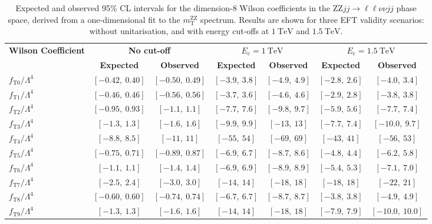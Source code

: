 \begin{table}[!htbp]
\centering
\scriptsize
\renewcommand{\arraystretch}{1.5}
\begin{tabular}{l c c c c c c}
\hline
\textbf{Wilson Coefficient} & 
\multicolumn{2}{c}{\textbf{No cut-off}} & 
\multicolumn{2}{c}{\textbf{$E_{\text{c}} = 1~\text{TeV}$}} & 
\multicolumn{2}{c}{\textbf{$E_{\text{c}} = 1.5~\text{TeV}$}} \\
\cline{2-7}
& \textbf{Expected} & \textbf{Observed} & 
  \textbf{Expected} & \textbf{Observed} & 
  \textbf{Expected} & \textbf{Observed} \\
\hline
$f_{\text{T}0}/\Lambda^4$ & $[-0.42,\ 0.40]$ & $[-0.50,\ 0.49]$ & $[-3.9,\ 3.8]$ & $[-4.9,\ 4.9]$ & $[-2.8,\ 2.6]$ & $[-4.0,\ 3.4]$ \\
$f_{\text{T}1}/\Lambda^4$ & $[-0.46,\ 0.46]$ & $[-0.56,\ 0.56]$ & $[-3.7,\ 3.6]$ & $[-4.6,\ 4.6]$ & $[-2.9,\ 2.8]$ & $[-3.8,\ 3.8]$ \\
$f_{\text{T}2}/\Lambda^4$ & $[-0.95,\ 0.93]$ & $[-1.1,\ 1.1]$ & $[-7.7,\ 7.6]$ & $[-9.8,\ 9.7]$ & $[-5.9,\ 5.6]$ & $[-7.7,\ 7.4]$ \\
$f_{\text{T}3}/\Lambda^4$ & $[-1.3,\ 1.3]$ & $[-1.6,\ 1.6]$ & $[-9.9,\ 9.9]$ & $[-13,\ 13]$ & $[-7.7,\ 7.4]$ & $[-10.0,\ 9.7]$ \\
$f_{\text{T}4}/\Lambda^4$ & $[-8.8,\ 8.5]$ & $[-11,\ 11]$ & $[-55,\ 54]$ & $[-69,\ 69]$ & $[-43,\ 41]$ & $[-56,\ 53]$ \\
$f_{\text{T}5}/\Lambda^4$ & $[-0.75,\ 0.71]$ & $[-0.89,\ 0.87]$ & $[-6.9,\ 6.7]$ & $[-8.7,\ 8.6]$ & $[-4.8,\ 4.4]$ & $[-6.2,\ 5.8]$ \\
$f_{\text{T}6}/\Lambda^4$ & $[-1.1,\ 1.1]$ & $[-1.4,\ 1.4]$ & $[-6.9,\ 6.9]$ & $[-8.9,\ 8.9]$ & $[-5.4,\ 5.3]$ & $[-7.1,\ 7.0]$ \\
$f_{\text{T}7}/\Lambda^4$ & $[-2.5,\ 2.4]$ & $[-3.0,\ 3.0]$ & $[-14,\ 14]$ & $[-18,\ 18]$ & $[-18,\ 18]$ & $[-22,\ 21]$ \\
$f_{\text{T}8}/\Lambda^4$ & $[-0.60,\ 0.60]$ & $[-0.74,\ 0.74]$ & $[-6.7,\ 6.7]$ & $[-8.7,\ 8.7]$ & $[-3.8,\ 3.8]$ & $[-4.9,\ 4.9]$ \\
$f_{\text{T}9}/\Lambda^4$ & $[-1.3,\ 1.3]$ & $[-1.6,\ 1.6]$ & $[-14,\ 14]$ & $[-18,\ 18]$ & $[-7.9,\ 7.9]$ & $[-10.0,\ 10.0]$ \\
\hline
\end{tabular}
\caption{\rm Expected and observed 95\% CL intervals for the dimension-8 Wilson coefficients in the 
$\text{ZZ}jj \to \ell\ell\nu\nu jj$ phase space, derived from a one-dimensional fit to the $m_{\text{T}}^{\text{ZZ}}$ spectrum. Results are shown for three EFT validity scenarios: without unitarisation, and with energy cut-offs at $1~\text{TeV}$ and $1.5~\text{TeV}$.}
\label{tab:combined_run2_ZZjj_eft_intervals}
\end{table}

